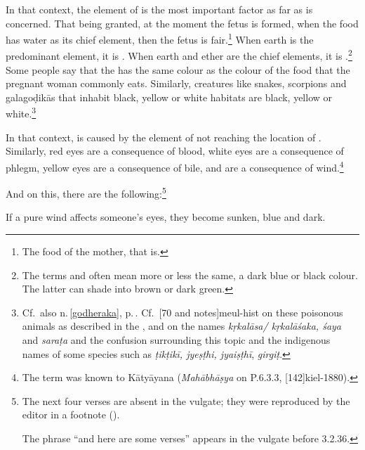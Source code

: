 \begin{translation}
In that context, the element of  is the most important
factor as far as  is concerned. That being
granted, at the moment the fetus is formed, when the food has water as
its chief element, then the fetus is fair.\footnote{The food of the
    mother, that is.}  When earth is the predominant element, it is
    . When earth and ether are the chief elements, it is
    .\footnote{The terms  and 
        often mean more or less the same, a dark blue or black colour. The
        latter can shade into brown or dark green.}  Some people say that the
         has the same colour as the colour of the food
        that the pregnant woman commonly eats. Similarly, creatures like
        snakes, scorpions and \glspl{galagoḍikā} that inhabit black, yellow or
        white habitats are black, yellow or
        white.\footnote{\label{galagodika}Cf.\ also n.\,\ref{godheraka},
            p.\,\pageref{godheraka}. Cf.\ [70 and notes]{meul-hist} on
            these poisonous animals as described in the \CS, and
            \cite[455-456]{meul-1974} on the names \emph{kṛkalāsa\slash
            kṛkalāśaka, śaya} and \emph{saraṭa} and the confusion surrounding this
            topic and the indigenous names of some species such as \emph{ṭikṭikī,
            jyeṣṭhi, jyaiṣṭhī}, \emph{girgiṭ}.}
            
            In that context,  is
caused by the element of  not
reaching the location of .  Similarly, red
eyes are a consequence of blood, white eyes are a
consequence of phlegm, yellow eyes are a consequence of
bile, and  are a
consequence of wind.\footnote{The term 
    was known to Kātyāyana (\emph{Mahābhāṣya} on P.6.3.3,
    [142]{kiel-1880}).}
  


\item[35.1--4]

And on this, there are the following:\footnote{The next four verses are 
absent in the vulgate; they were reproduced by the 
editor in a footnote (\cite[348a, n.\,3]{vulgate}).

The phrase “and here are some verses” appears 
in the vulgate before 3.2.36.}

\begin{sloka}
If a pure wind affects someone's eyes, they become
sunken, blue and dark.


\end{sloka}
\end{translation}
